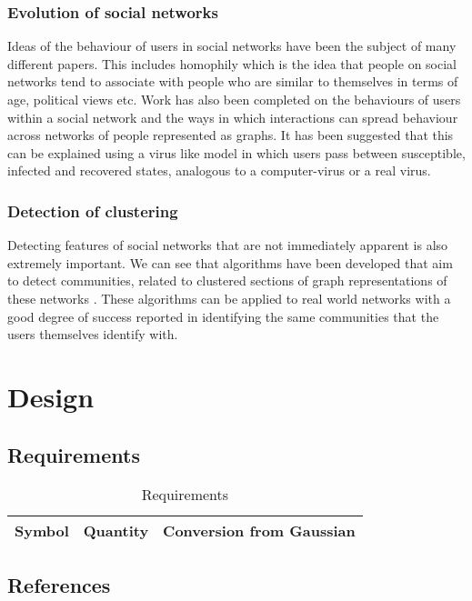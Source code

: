 \documentclass[12pt,a4paper]{article}
\begin{document}
\subsubsection{Evolution of social networks}
Ideas of the behaviour of users in social networks have been the subject of many different papers. This includes homophily \cite{adamic2003social} which is the idea that people on social networks tend to associate with people who are similar to themselves in terms of age, political views etc. Work has also been completed on the behaviours of users within a social network and the ways in which interactions can spread behaviour across networks of people represented as graphs. It has been suggested that this can be explained using a virus like model \cite{centola2010spread} in which users pass between susceptible, infected and recovered states, analogous to a computer-virus or a real virus.

\subsubsection{Detection of clustering}
Detecting features of social networks that are not immediately apparent is also extremely important. We can see that algorithms have been developed that aim to detect communities, related to clustered sections of graph representations of these networks \cite{newman2004fast}. These algorithms can be applied to real world networks with a good degree of success reported in identifying the same communities that the users themselves identify with.

\section{Design}

\subsection{Requirements}

\begin{table}[htb]
\centering
\caption{Requirements}
\vspace*{6pt}
\label{units}
\begin{tabular}{ccc}\hline\hline
Symbol & Quantity & Conversion from Gaussian \\ \hline
\end{tabular}
\end{table}

\subsection{References}


\end{document}
